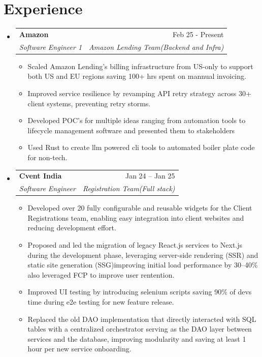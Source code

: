 \documentclass[letterpaper,11pt]{article}
\makeatletter
\newcommand{\resumeItem}[1]{
  \item\small{
    {#1 \vspace{-2pt}}
  }
}
\newcommand{\resumeSubheading}[4]{
  \vspace{-2pt}\item
    \begin{tabular*}{0.97\textwidth}[t]{l@{\extracolsep{\fill}}r}
      \textbf{#1} & #2 \\
      \textit{\small#3} & \textit{\small #4} \\
    \end{tabular*}\vspace{-7pt}
}
\newcommand{\resumeSubHeadingListStart}{\begin{itemize}[leftmargin=0.15in, label={}]}
\newcommand{\resumeSubHeadingListEnd}{\end{itemize}}
\newcommand{\resumeItemListStart}{\begin{itemize}}
\newcommand{\resumeItemListEnd}{\end{itemize}\vspace{-5pt}}
\makeatother
\begin{document}
\section{Experience}
  \resumeSubHeadingListStart
    \resumeSubheading
      {Amazon }{Feb 25 - Present}
      {Software Engineer 1}{Amazon Lending Team(Backend and Infra)}
      \vspace{-5pt}
      \resumeItemListStart
        \resumeItem{ Scaled Amazon Lending's billing infrastructure from US-only to support both US and EU regions saving 100+ hrs spent on mannual invoicing.  }
        \resumeItem{ Improved service resilience by revamping API retry strategy across 30+ client systems, preventing retry storms. }   
        \resumeItem{ Developed POC's for multiple ideas ranging from automation tools to lifecycle management software and presented them to stakeholders  } 
        \resumeItem{ Used Rust to create llm powered cli tools to automated boiler plate code for non-tech.  }
      \resumeItemListEnd
      \vspace{.5ex}
    \resumeSubheading
      {Cvent India }{Jan 24 – Jan 25}
      {Software Engineer }{Registration Team(Full stack) }
      \vspace{-5pt}
      \resumeItemListStart
        \resumeItem{ Developed over 20 fully configurable and reusable widgets for the Client Registrations team, enabling easy integration into client websites and reducing development effort. }
        \resumeItem{ Proposed and led the migration of legacy React.js services to Next.js during the development phase, leveraging server-side rendering (SSR) and static site generation (SSG)improving initial load performance by 30–40\% also leveraged FCP to improve user rentention.}
        \resumeItem{ Improved UI testing by introducing selenium scripts saving 90\% of devs time during e2e testing for new feature release.  }
        \resumeItem{ Replaced the old DAO implementation that directly interacted with SQL tables with a centralized orchestrator serving as the DAO layer between services and the database, improving modularity and saving at least 1 hour per new service onboarding. }
      \resumeItemListEnd
      \vspace{.5ex}
    
    
      
\resumeSubHeadingListEnd
\end{document}
